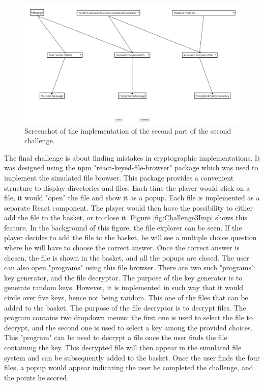 \documentclass{l4proj}
\begin{document}
\begin{figure}[b]
    \centering
    \includegraphics[width=\textwidth, frame]{images/Challenge2Imp.PNG}
    \caption{Screenshot of the implementation of the second part of the second challenge.}
    \label{fig:Challenge2Imp}
\end{figure}

The final challenge is about finding mistakes in cryptographic implementations.
It was designed using the npm "react-keyed-file-browser" package which was used to implement the simulated file browser.
This package provides a convenient structure to display directories and files.
Each time the player would click on a file, it would "open" the file and show it as a popup.
Each file is implemented as a separate React component.
The player would then have the possibility to either add the file to the basket, or to close it.
Figure \ref{fig:Challenge3Imp} shows this feature. 
In the background of this figure, the file explorer can be seen. 
If the player decides to add the file to the basket, 
he will see a multiple choice question where he will have to choose the correct answer.
Once the correct answer is chosen, the file is shown in the basket, and all the popups are closed.
The user can also open "programs" using this file browser.
There are two such "programs": key generator, and the file decryptor.
The purpose of the key generator is to generate random keys.
However, it is implemented in such way that it would circle over five keys, 
hence not being random. This one of the files that can be added to the basket.
The purpose of the file decryptor is to decrypt files. 
The program contains two dropdown menus: the first one is used to select the file to decrypt,
and the second one is used to select a key among the provided choices. 
This "program" can be used to decrypt a file once the user finds the file containing the key.
This decrypted file will then appear in the simulated file system and can be subsequently added to the basket.
Once the user finds the four files, a popup would appear indicating the user he completed the challenge, and the points he scored.
\end{document}

